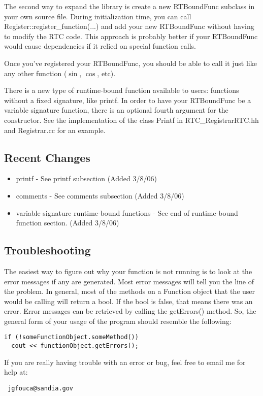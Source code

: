\documentclass{article}
\begin{document}
\noindent
The second way to expand the library is create a new RTBoundFunc subclass in
your own source file. During initialization time, you can call
Register::register\_function(...) and add your new RTBoundFunc without having
to modify the RTC code. This approach is probably better if your RTBoundFunc
would cause dependencies if it relied on special function calls.

\noindent
Once you've registered your RTBoundFunc, you should be able to call it just
like any other function ($\sin$, $\cos$, etc).

\noindent
There is a new type of runtime-bound function available to users: functions
without a fixed signature, like printf. In order to have your RTBoundFunc be
a variable signature function, there is an optional fourth argument for the
constructor. See the implementation of the class Printf in RTC\_RegistrarRTC.hh and
Registrar.cc for an example.

\subsection{Recent Changes}

\begin{itemize}
  \item printf - See printf subsection (Added 3/8/06)
  \item comments - See comments subsection (Added 3/8/06)
  \item variable signature runtime-bound functions - See end of runtime-bound
        function section. (Added 3/8/06)
\end{itemize}

\subsection{Troubleshooting}

The easiest way to figure out why your function is not running is to look at
the error messages if any are generated. Most error messages will tell you the
line of the problem. In general, most of the methods on a Function object that
the user would be calling will return a bool. If the bool is false, that means
there was an error. Error messages can be retrieved by calling the getErrors()
method. So, the general form of your usage of the program should resemble the
following:
{\ttfamily \begin{verbatim}
if (!someFunctionObject.someMethod())
  cout << functionObject.getErrors();
\end{verbatim} }

\noindent
If you are really having trouble with an error or bug, feel free to email me
for help at: \begin{verbatim} jgfouca@sandia.gov \end{verbatim}
\end{document}
